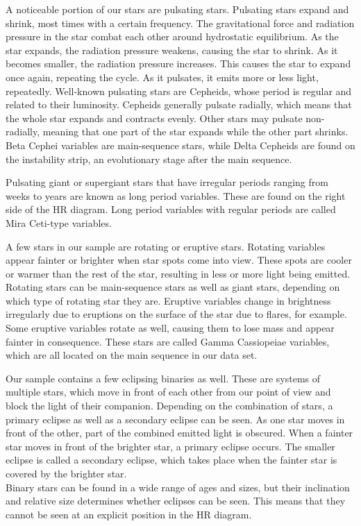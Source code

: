 \documentclass{aa}
\begin{document}
  A noticeable portion of our stars are pulsating stars.
  Pulsating stars expand and shrink, most times with a certain frequency. The gravitational force and radiation pressure in the star combat each other around hydrostatic equilibrium. As the star expands, the radiation pressure weakens, causing the star to shrink. As it becomes smaller, the radiation pressure increases. This causes the star to expand once again, repeating the cycle. As it pulsates, it emits more or less light, repeatedly.
Well-known pulsating stars are Cepheids, whose period is regular and related to their luminosity. Cepheids generally pulsate radially, which means that the whole star expands and contracts evenly. Other stars may pulsate non-radially, meaning that one part of the star expands while the other part shrinks. Beta Cephei variables are main-sequence stars, while Delta Cepheids are found on the instability strip, an evolutionary stage after the main sequence.

Pulsating giant or supergiant stars that have irregular periods ranging from weeks to years are known as long period variables. These are found on the right side of the HR diagram. Long period variables with regular periods are called Mira Ceti-type variables. 

A few stars in our sample are rotating or eruptive stars. Rotating variables appear fainter or brighter when star spots come into view. These spots are cooler or warmer than the rest of the star, resulting in less or more light being emitted. Rotating stars can be main-sequence stars as well as giant stars, depending on which type of rotating star they are. Eruptive variables change in brightness irregularly due to eruptions on the surface of the star due to flares, for example. Some eruptive variables rotate as well, causing them to lose mass and appear fainter in consequence. These stars are called Gamma Cassiopeiae variables, which are all located on the main sequence in our data set. 

Our sample contains a few eclipsing binaries as well. These are systems of multiple stars, which move in front of each other from our point of view and block the light of their companion. Depending on the combination of stars, a primary eclipse as well as a secondary eclipse can be seen. As one star moves in front of the other, part of the combined emitted light is obscured. When a fainter star moves in front of the brighter star, a primary eclipse occurs. The smaller eclipse is called a secondary eclipse, which takes place when the fainter star is covered by the brighter star.\\
Binary stars can be found in a wide range of ages and sizes, but their inclination and relative size determines whether eclipses can be seen. This means that they cannot be seen at an explicit position in the HR diagram.
\end{document}
